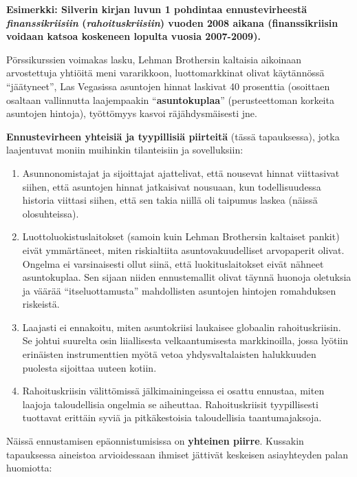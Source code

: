 \documentclass[
]{book}
\providecommand{\tightlist}{%
  \setlength{\itemsep}{0pt}\setlength{\parskip}{0pt}}
\begin{document}
\begin{eblock}{}

\textbf{Esimerkki: Silverin kirjan luvun 1 pohdintaa ennustevirheestä \emph{finanssikriisiin} (\emph{rahoituskriisiin}) vuoden 2008 aikana (finanssikriisin voidaan katsoa koskeneen lopulta vuosia 2007-2009).}

Pörssikurssien voimakas lasku, Lehman Brothersin kaltaisia aikoinaan arvostettuja yhtiöitä meni vararikkoon, luottomarkkinat olivat käytännössä ``jäätyneet'', Las Vegasissa asuntojen hinnat laskivat 40 prosenttia (osoittaen osaltaan vallinnutta laajempaakin ``\textbf{asuntokuplaa}'' (perusteettoman korkeita asuntojen hintoja), työttömyys kasvoi räjähdysmäisesti jne.

\hfill\break

\textbf{Ennustevirheen yhteisiä ja tyypillisiä piirteitä} (tässä tapauksessa), jotka laajentuvat moniin muihinkin tilanteisiin ja sovelluksiin:

\begin{enumerate}
\def\labelenumi{\arabic{enumi}.}
\tightlist
\item
  Asunnonomistajat ja sijoittajat ajattelivat, että nousevat hinnat viittasivat siihen, että asuntojen hinnat jatkaisivat nousuaan, kun todellisuudessa historia viittasi siihen, että sen takia niillä oli taipumus laskea (näissä olosuhteissa).
\item
  Luottoluokistuslaitokset (samoin kuin Lehman Brothersin kaltaiset pankit) eivät ymmärtäneet, miten riskialtiita asuntovakuudelliset arvopaperit olivat. Ongelma ei varsinaisesti ollut siinä, että luokituslaitokset eivät nähneet asuntokuplaa. Sen sijaan niiden ennustemallit olivat täynnä huonoja oletuksia ja väärää ``itseluottamusta'' mahdollisten asuntojen hintojen romahduksen riskeistä.
\item
  Laajasti ei ennakoitu, miten asuntokriisi laukaisee globaalin rahoituskriisin. Se johtui suurelta osin liiallisesta velkaantumisesta markkinoilla, jossa lyötiin erinäisten instrumenttien myötä vetoa yhdysvaltalaisten halukkuuden puolesta sijoittaa uuteen kotiin.
\item
  Rahoituskriisin välittömissä jälkimainingeissa ei osattu ennustaa, miten laajoja taloudellisia ongelmia se aiheuttaa. Rahoituskriisit tyypillisesti tuottavat erittäin syviä ja pitkäkestoisia taloudellisia taantumajaksoja.
\end{enumerate}

Näissä ennustamisen epäonnistumisissa on \textbf{yhteinen piirre}. Kussakin tapauksessa aineistoa arvioidessaan ihmiset jättivät keskeisen asiayhteyden palan huomiotta:


\end{eblock}
\end{document}
